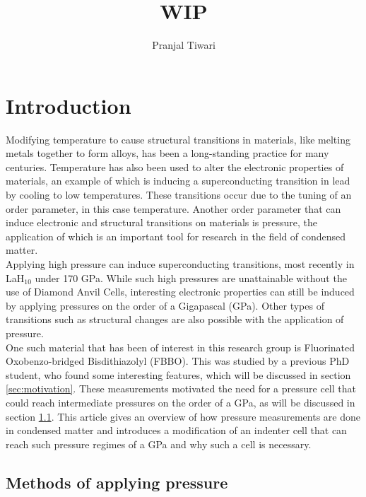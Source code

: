 \documentclass[11pt,onecolumn]{article}
\title{WIP}
\author{Pranjal Tiwari}
\begin{document}
\maketitle

\section{Introduction}

Modifying temperature to cause structural transitions in materials, like melting metals together to form alloys, has been a long-standing practice for many centuries. Temperature has also been used to alter the electronic properties of materials, an example of which is inducing a superconducting transition in lead by cooling to low temperatures. These transitions occur due to the tuning of an order parameter, in this case temperature. Another order parameter that can induce electronic and structural transitions on materials is pressure, the application of which is an important tool for research in the field of condensed matter.\cite{UseofPressure}\\

Applying high pressure can induce superconducting transitions, most recently in LaH$_{10}$ under 170 GPa.\cite{LaHunderpressure} While such high pressures are unattainable without the use of Diamond Anvil Cells, interesting electronic properties can still be induced by applying pressures on the order of a Gigapascal (GPa). Other types of transitions such as structural changes are also possible with the application of pressure.\\

One such material that has been of interest in this research group is Fluorinated Oxobenzo-bridged Bisdithiazolyl (FBBO). This was studied by a previous PhD student, who found some interesting features,\cite{Di_thesis} which will be discussed in section \ref{sec:motivation}. These measurements motivated the need for a pressure cell that could reach intermediate pressures on the order of a GPa, as will be discussed in section \ref{sec:applying}. This article gives an overview of how pressure measurements are done in condensed matter and introduces a modification of an indenter cell that can reach such pressure regimes of a GPa and why such a cell is necessary.

\subsection{Methods of applying pressure}
\label{sec:applying}
\end{document}
